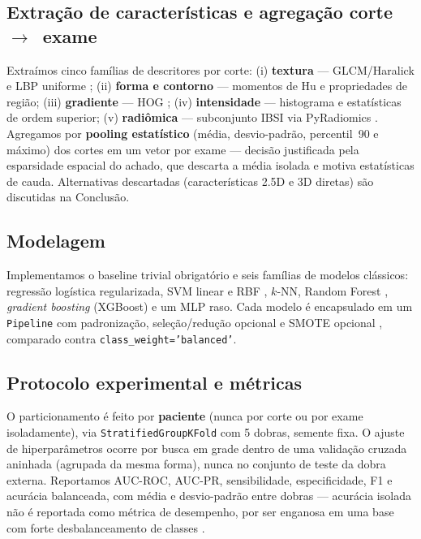 \documentclass[12pt,a4paper]{article}
\begin{document}
\subsection{Extração de características e agregação corte~$\to$~exame}
Extraímos cinco famílias de descritores por corte: (i) \textbf{textura} ---
GLCM/Haralick \cite{haralick1973textural} e LBP uniforme \cite{ojala2002lbp};
(ii) \textbf{forma e contorno} --- momentos de Hu e propriedades de região;
(iii) \textbf{gradiente} --- HOG \cite{dalal2005hog}; (iv) \textbf{intensidade}
--- histograma e estatísticas de ordem superior; (v) \textbf{radiômica} ---
subconjunto IBSI via PyRadiomics \cite{vangriethuysen2017pyradiomics}. Agregamos
por \textbf{pooling estatístico} (média, desvio-padrão, percentil~90 e máximo)
dos cortes em um vetor por exame --- decisão justificada pela esparsidade
espacial do achado, que descarta a média isolada e motiva estatísticas de cauda.
Alternativas descartadas (características 2.5D e 3D diretas) são discutidas na
Conclusão.

\subsection{Modelagem}
Implementamos o baseline trivial obrigatório e seis famílias de modelos clássicos:
regressão logística regularizada, SVM linear e RBF \cite{cortes1995svm}, $k$-NN,
Random Forest \cite{breiman2001randomforests}, \emph{gradient boosting} (XGBoost)
\cite{chen2016xgboost} e um MLP raso. Cada modelo é encapsulado em um
\texttt{Pipeline} com padronização, seleção/redução opcional e SMOTE opcional
\cite{chawla2002smote}, comparado contra \texttt{class\_weight='balanced'}.

\subsection{Protocolo experimental e métricas}
\label{sec:protocolo}
O particionamento é feito por \textbf{paciente} (nunca por corte ou por exame
isoladamente), via \texttt{StratifiedGroupKFold} com 5 dobras, semente fixa. O
ajuste de hiperparâmetros ocorre por busca em grade dentro de uma validação cruzada
aninhada (agrupada da mesma forma), nunca no conjunto de teste da dobra externa.
Reportamos AUC-ROC, AUC-PR, sensibilidade, especificidade, F1
e acurácia balanceada, com média e desvio-padrão entre dobras --- acurácia isolada
não é reportada como métrica de desempenho, por ser enganosa em uma base com forte
desbalanceamento de classes \cite{colak2021rsnadataset}.
\end{document}
